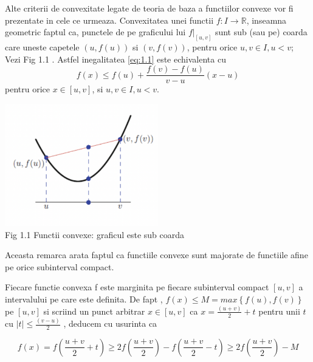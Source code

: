 \documentclass[a4paper,12pt,oneside]{report}
\begin{document}
Alte criterii de convexitate legate de teoria de baza a functiilor convexe vor fi prezentate in cele ce urmeaza. 
Convexitatea unei functii \(f : I\rightarrow \mathbb{R}\), inseamna geometric faptul ca, punctele de pe graficului lui  \(f|_{\left [ u,v \right ]}\) sunt sub (sau pe) coarda care uneste capetele \(\left ( u , f {\left ( u \right )} \right )\)  si \(\left ( v , f {\left ( v \right )} \right )\), pentru orice \(u, v \in I, u < v\); 
Vezi Fig 1.1 . Astfel inegalitatea \ref{eq:1.1} este echivalenta cu 
\begin{displaymath}
  f\left ( x \right )\leq f\left ( u \right ) +\frac{f\left ( v \right )- f\left ( u \right )}{v - u}\left ( x - u \right ) \label{eq:1.2} \tag{1.2}
\end{displaymath}
pentru orice \(x\in \left [  u, v\right ]\), si \(u, v \in I, u < v\). 

\begin{center}
	\includegraphics[width=0.5\textwidth]{fig1.1.png}
	\\ Fig 1.1 Functii convexe: graficul este sub coarda
\end{center}

Aceasta remarca arata faptul ca functiile convexe sunt majorate de functiile afine pe orice subinterval compact. 

Fiecare functie convexa f este marginita pe fiecare subinterval compact \(\left [ u , v \right ]\) a intervalului pe care este definita. De fapt , \(f\left ( x \right ) \leq  M = max \left \{ f\left ( u \right ), f\left ( v \right ) \right \}\)  pe \(\left [ u , v \right ]\)  si scriind un punct arbitrar \(x\in  \left [ u , v  \right ]\)  ca  \(x= \frac{\left ( u + v \right )}{2} + t\) pentru unii \(t\) cu \(\left | t \right |\leq \frac{\left ( v - u \right )}{2}\) , deducem cu usurinta ca 

\begin{displaymath}
  f\left ( x \right )=  f\left ( \frac{u+v}{2} + t\right )\geq 2 f\left ( \frac{u + v}{2} \right )- f\left ( \frac{u + v}{2} - t\right )\geq 2f\left ( \frac{u+v}{2} \right ) - M
\end{displaymath}
\end{document}
